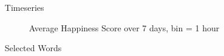 \documentclass[final]{beamer}
\newlength{\sepwid}
\newlength{\onecolwid}
\begin{document}
\begin{frame}[t]
\begin{columns}[t]
\begin{column}{\sepwid}\end{column} %

\begin{column}{\onecolwid} %

\begin{block}{Timeseries}
\begin{figure}[h]
\caption{Average Happiness Score over 7 days, bin = 1 hour}
\end{figure}
\end{block}
\vspace*{-2cm}\begin{block}{Selected Words}

\begin{figure}[h]
\begin{center}
\end{center}
\end{figure}
\end{block}
\end{column}
\end{columns}
\end{frame}
\end{document}
